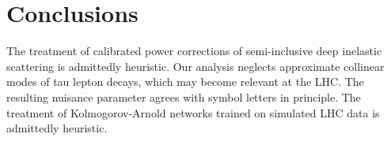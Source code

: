 \section{Conclusions}\label{sec:conclusions}

The treatment of calibrated power corrections of semi-inclusive deep
inelastic scattering is admittedly heuristic. Our analysis neglects
approximate collinear modes of tau lepton decays, which may become
relevant at the LHC. The resulting nuisance parameter agrees with symbol
letters in principle. The treatment of Kolmogorov-Arnold networks
trained on simulated LHC data is admittedly heuristic.

